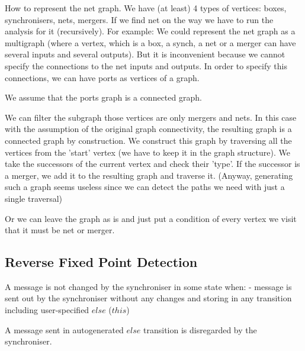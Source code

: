 How to represent the net graph.
We have (at least) 4 types of vertices: boxes, synchronisers, nets, mergers.
If we find net on the way we have to run the analysis for it (recursively). For example:
%
We could represent the net graph as a multigraph (where a vertex, which is a box, a synch, a net or a merger can have several inputs and several outputs).
But it is inconvenient because we cannot specify the connections to the net inputs and outputs. In order to specify this connections, we can have ports as vertices of a graph.

We assume that the ports graph is a connected graph.

We can filter the subgraph those vertices are only mergers and nets. In this case with the assumption of the original graph connectivity, the resulting graph is a connected graph by construction.
We construct this graph by traversing all the vertices from the 'start' vertex (we have to keep it in the graph structure). We take the successors of the current vertex and check their 'type'. If the successor is a merger, we add it to the resulting graph and traverse it. (Anyway, generating such a graph seems useless since we can detect the paths we need with just a single traversal)

Or we can leave the graph as is and just put a condition of every vertex we visit that it must be net or merger.


    \subsection{Reverse Fixed Point Detection\label{rfp_detect}}
A message is not changed by the synchroniser in some state when:
- message is sent out by the synchroniser without any changes and storing in any transition including user-specified $else$ ($this$)

A message sent in autogenerated $else$ transition is disregarded by the synchroniser.

